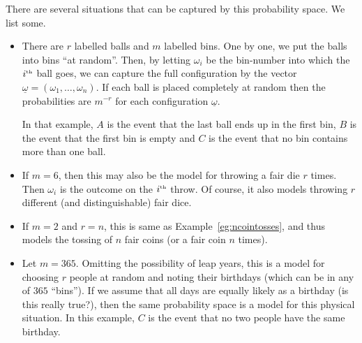 \documentclass[preprint,  11pt]{amsart}
\newcommand{\para}[1]{\vspace{4mm}\noindent{\bfseries #1:}}
\def\ome{\omega}
\theoremstyle{plain} %
\theoremstyle{definition} %
\begin{document}
\para{Example~\ref{eg:rballsinmbins}} There are several situations that can be captured by this probability space. We list some.
\begin{itemize}\setlength\itemsep{3pt}
\item There are $r$ labelled balls and $m$ labelled bins. One by one, we put the balls into bins ``at random''. Then, by letting $\omega_{i}$ be the bin-number into which the $i^{\mbox{\tiny th}}$ ball goes, we can capture the full configuration by the vector $\underline{\ome}=(\omega_{1},\ldots ,\omega_{n})$. If each ball is placed completely at random then the probabilities are $m^{-r}$ for each configuration $\underline{\ome}$. 

In that example, $A$ is the event that the last ball ends up in the first bin, $B$ is the event that the first bin is empty and $C$ is the event that no bin contains more than one ball. 
\item If $m=6$, then this may also be the model for throwing a fair die $r$ times. Then $\omega_{i}$ is the outcome on the $i^{\mbox{\tiny th}}$ throw. Of course, it also models throwing $r$ different (and distinguishable) fair dice.
\item If $m=2$ and $r=n$, this is same as Example~\ref{eg:ncointosses}, and thus models the tossing of $n$ fair coins (or a fair coin $n$ times).
\item Let $m=365$. Omitting the possibility of leap years, this is a model for choosing $r$ people at random and noting their birthdays (which can be in any of $365$ ``bins''). If we assume that all days are equally likely as a birthday (is this really true?), then the same probability space is a model for this physical situation. In this example, $C$ is the event that no two people have the same birthday.
\end{itemize}
\end{document}
